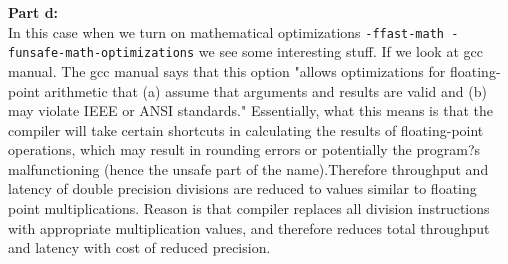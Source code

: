 \documentclass[letterpaper, 11pt]{article}
\begin{document}
\textbf{Part d:} \\
In this case when we turn on mathematical optimizations \texttt{-ffast-math -funsafe-math-optimizations} we see some interesting stuff. If we look at gcc manual. The gcc manual says that this option "allows optimizations for floating-point arithmetic that (a) assume that arguments and results are valid and (b) may violate IEEE or ANSI standards."
Essentially, what this means is that the compiler will take certain shortcuts in calculating the results of floating-point operations, which may result in rounding errors or potentially the program?s malfunctioning (hence the unsafe part of the name).Therefore throughput and latency of double precision divisions are reduced to values similar to  floating point multiplications. Reason
is that compiler replaces all division instructions with appropriate multiplication values, and therefore
reduces total throughput and latency with cost of reduced precision.
\bigskip

\clearpage

\end{document}
